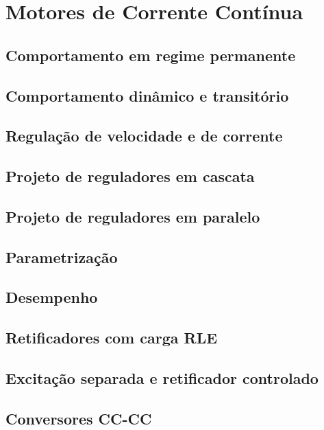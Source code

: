 \section{Motores de Corrente Contínua}



\subsection{Comportamento em regime permanente}


 
\subsection{Comportamento dinâmico e transitório}



\subsection{Regulação de velocidade e de corrente}



\subsection{Projeto de reguladores em cascata}
 

 
\subsection{Projeto de reguladores em paralelo}



\subsection{Parametrização}



\subsection{Desempenho}


 
\subsection{Retificadores com carga RLE}


 
\subsection{Excitação separada e retificador controlado}


 
\subsection{Conversores CC-CC}



